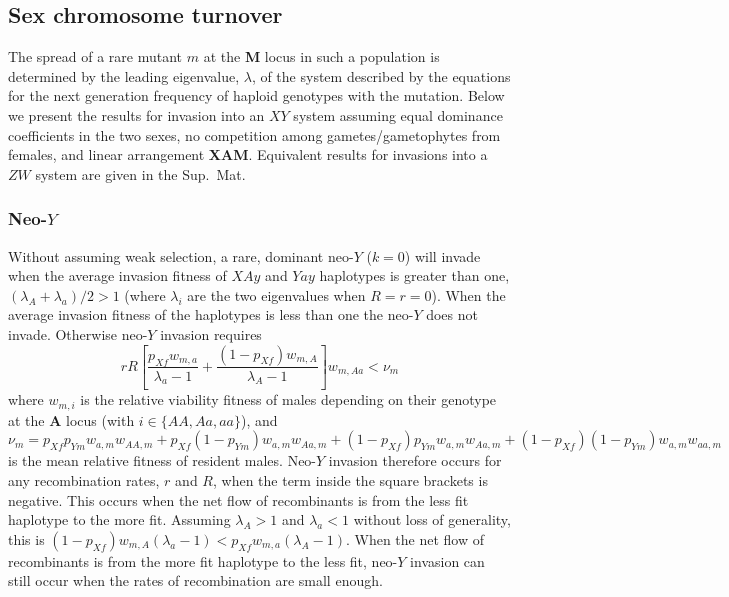 \documentclass[12pt]{article}
\begin{document}
\subsection*{Sex chromosome turnover}
The spread of a rare mutant $m$ at the \textbf{M} locus in such a population is determined by the leading eigenvalue, $\lambda$, of the system described by the equations for the next generation frequency of haploid genotypes with the mutation. %
Below we present the results for invasion into an $XY$ system assuming equal dominance coefficients in the two sexes, no competition among gametes/gametophytes from females, and linear arrangement \textbf{X}\textbf{A}\textbf{M}.
Equivalent results for invasions into a $ZW$ system are given in the Sup.\ Mat.

\subsubsection*{Neo-$Y$}

Without assuming weak selection, a rare, dominant neo-$Y$ ($k=0$) will invade when the average invasion fitness of $XAy$ and $Yay$ haplotypes is greater than one, $(\lambda_A + \lambda_a)/2 >1$ (where $\lambda_i$ are the two eigenvalues when $R=r=0$).
When the average invasion fitness of the haplotypes is less than one the neo-$Y$ does not invade.
Otherwise neo-$Y$ invasion requires
\begin{equation}
r R \left[ \frac{p_{Xf} w_{m,a}}{\lambda_a - 1} + \frac{(1 - p_{Xf}) w_{m,A}}{\lambda_A - 1} \right] w_{m,Aa} < \nu_m
\end{equation}
where $w_{m,i}$ is the relative viability fitness of males depending on their genotype at the \textbf{A} locus (with $i\in\{AA,Aa,aa\}$), and 
$\nu_m = 
  p_{Xf} p_{Ym} w_{a,m} w_{AA,m} +
  p_{Xf} (1-p_{Ym}) w_{a,m} w_{Aa,m} +
  (1-p_{Xf}) p_{Ym} w_{a,m} w_{Aa,m} +
  (1-p_{Xf}) (1-p_{Ym}) w_{a, m} w_{aa,m}$
is the mean relative fitness of resident males.
Neo-$Y$ invasion therefore occurs for any recombination rates, $r$ and $R$, when the term inside the square brackets is negative.
This occurs when the net flow of recombinants is from the less fit haplotype to the more fit.
Assuming $\lambda_A>1$ and $\lambda_a<1$ without loss of generality, this is $(1 - p_{Xf}) w_{m,A} (\lambda_a -1) < p_{Xf} w_{m,a} (\lambda_A -1)$.
When the net flow of recombinants is from the more fit haplotype to the less fit, neo-$Y$ invasion can still occur when the rates of recombination are small enough.
\end{document}
